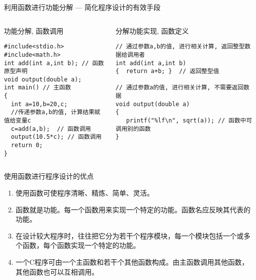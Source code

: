 \begin{frame}{利用函数进行功能分解 --- 简化程序设计的有效手段}
\vspace{-0.3cm}
\begin{columns}[T]
\begin{beamerboxesrounded}{功能分解, 函数调用}
\begin{lstlisting}
#include<stdio.h>
#include<math.h>
int add(int a,int b); // 函数原型声明
void output(double a);
int main() // 主函数
{
  int a=10,b=20,c;
  //传递参数a,b的值, 计算结果赋值给变量c 
  c=add(a,b);  // 函数调用
  output(10.5*c); // 函数调用
  return 0; 
}
\end{lstlisting}
\end{beamerboxesrounded}
\begin{beamerboxesrounded}{分解功能实现, 函数定义}
\begin{lstlisting}
// 通过参数a,b的值, 进行相关计算, 返回整型数据给调用者
int add(int a,int b)
{  return a+b; }  // 返回整型值

// 通过参数a的值, 进行相关计算, 不需要返回数据
void output(double a)
{  
   printf("%lf\n", sqrt(a)); // 函数中可调用别的函数
}
\end{lstlisting}
\end{beamerboxesrounded}
\end{columns}
\end{frame}

\begin{frame}{使用函数进行程序设计的优点}
\begin{enumerate}
	\setlength{\itemsep}{.5cm}
	\item 使用函数可使程序清晰、精炼、简单、灵活。
	\item 函数就是功能。每一个函数用来实现一个特定的功能。函数名应反映其代表的功能。
	\item 在设计较大程序时，往往把它分为若干个程序模块，每一个模块包括一个或多个函数，每个函数实现一个特定的功能。
	\item 一个C程序可由一个主函数和若干个其他函数构成。由主函数调用其他函数，其他函数也可以互相调用。	
\end{enumerate}
\end{frame}


